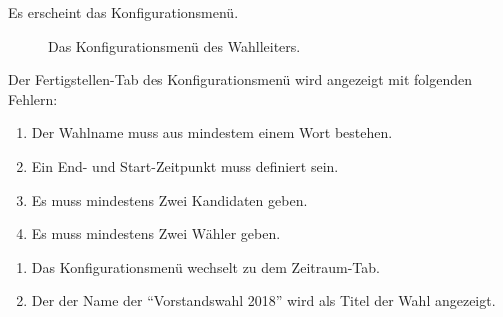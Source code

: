 \documentclass[parskip=full]{scrartcl}
\begin{document}
		{Es erscheint das Konfigurationsmenü.}

\begin{figure}[h!]
	\caption{\label{fig:sup_configuration}
		Das Konfigurationsmenü des Wahlleiters.
	}
\end{figure}

		{Der Fertigstellen-Tab des Konfigurationsmenü wird angezeigt mit folgenden Fehlern:
		\begin{enumerate}
			\item Der Wahlname muss aus mindestem einem Wort bestehen.
			\item Ein End- und Start-Zeitpunkt muss definiert sein.
			\item Es muss mindestens Zwei Kandidaten geben.
			\item Es muss mindestens Zwei Wähler geben.
		\end{enumerate}}

		{\begin{enumerate}
				\item Das Konfigurationsmenü wechselt zu dem Zeitraum-Tab.
				\item Der der Name der \enquote{Vorstandswahl 2018} wird als Titel der Wahl angezeigt.
		\end{enumerate}}
\end{document}
